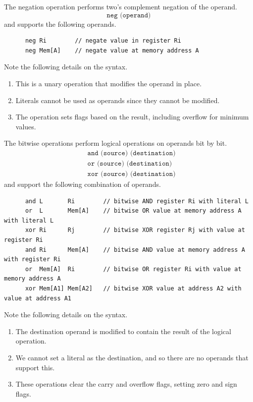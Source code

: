   \begin{definition}[Negation]
    The negation operation performs two's complement negation of the operand.
    \begin{equation}
      \texttt{neg (operand)}
    \end{equation}
    and supports the following operands.
    \begin{lstlisting}
      neg Ri        // negate value in register Ri
      neg Mem[A]    // negate value at memory address A
    \end{lstlisting}
    Note the following details on the syntax.
    \begin{enumerate}
      \item This is a unary operation that modifies the operand in place.
      \item Literals cannot be used as operands since they cannot be modified.
      \item The operation sets flags based on the result, including overflow for minimum values.
    \end{enumerate}
  \end{definition}

  \begin{definition}
    The bitwise operations perform logical operations on operands bit by bit.
    \begin{align*}
      & \texttt{and (source) (destination)} \\ 
      & \texttt{or (source) (destination)} \\
      & \texttt{xor (source) (destination)}
    \end{align*}
    and support the following combination of operands.
    \begin{lstlisting}
      and L       Ri        // bitwise AND register Ri with literal L
      or  L       Mem[A]    // bitwise OR value at memory address A with literal L
      xor Ri      Rj        // bitwise XOR register Rj with value at register Ri
      and Ri      Mem[A]    // bitwise AND value at memory address A with register Ri
      or  Mem[A]  Ri        // bitwise OR register Ri with value at memory address A
      xor Mem[A1] Mem[A2]   // bitwise XOR value at address A2 with value at address A1
    \end{lstlisting}
    Note the following details on the syntax.
    \begin{enumerate}
      \item The destination operand is modified to contain the result of the logical operation.
      \item We cannot set a literal as the destination, and so there are no operands that support this.
      \item These operations clear the carry and overflow flags, setting zero and sign flags.
    \end{enumerate}
  \end{definition}


